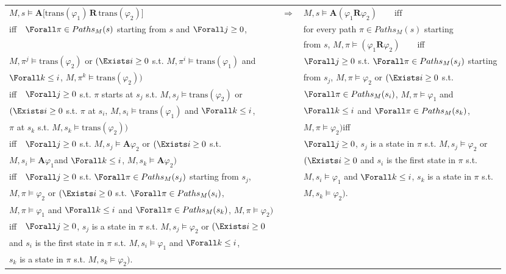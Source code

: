 {\begin{enumerate}
{\scriptsize
\begin{tabular}{lcl}
$M,s\vDash \mathbf{A[}\mathrm{trans}(\varphi _{1})\,\mathbf{R\,}\mathrm{trans%
}(\varphi _{2})]$ & $ \Rightarrow  $ & $M,s\vDash \mathbf{A}%
(\varphi _{1}\mathbf{R}\varphi _{2})\qquad \text{iff}$ \\ 
iff$\quad \Forall\pi \in Paths_{M}(s)$ starting from $s$ and $\Forall j\geq 0
$, &  & for every path $\pi \in Paths_{M}(s)$ starting \\ 
&  &  from $s$, $M,\pi \vDash (\varphi _{1}\mathbf{R}\varphi _{2})\qquad $iff
\\ 
$M,\pi ^{j}\vDash \mathrm{trans}(\varphi _{2})$ or $(\Exists i\geq 0$ s.t. $%
M,\pi ^{i}\vDash \mathrm{trans}(\varphi _{1})$ and &  & $\Forall j\geq 0$
s.t. $\Forall\pi \in Paths_{M}(s_{j})$ starting \\ 
$\Forall k\leq i$, $M,\pi ^{k}\vDash \mathrm{trans}(\varphi _{2}))$ &  & 
from $s_{j}$, $M,\pi \vDash \varphi _{2}$ or $(\Exists i\geq 0$ s.t. \\ 
iff$\quad \Forall j\geq 0$ s.t. $\pi $ starts at $s_{j}$ s.t. $M,s_{j}\vDash 
\mathrm{trans}(\varphi _{2})$ or &  & $\Forall\pi \in Paths_{M}(s_{i})$, $%
M,\pi \vDash \varphi _{1}$ and \\ 
$(\Exists i\geq 0$ s.t. $\pi $ at $s_{i}$, $M,s_{i}\vDash \mathrm{trans}%
(\varphi _{1})$ and $\Forall k\leq i$, &  & $\Forall k\leq i$ and $\Forall%
\pi \in Paths_{M}(s_{k})$, \\ 
$\pi $ at $s_{k}$ s.t. $M,s_{k}\vDash \mathrm{trans}(\varphi _{2}))$ &  &  $%
M,\pi \vDash \varphi _{2})$\qquad iff \\ 
iff$\quad \Forall j\geq 0$ s.t. $M,s_{j}\vDash \mathbf{A}\varphi _{2}$ or $(%
\Exists i\geq 0$ s.t. &  & $\Forall j\geq 0$, $s_{j}$ is a state in $\pi $
s.t. $M,s_{j}\vDash \varphi _{2}$ or \\ 
$M,s_{i}\vDash \mathbf{A}\varphi _{1}$and $\Forall k\leq i$, $M,s_{k}\vDash 
\mathbf{A}\varphi _{2})$ &  & $(\Exists i\geq 0$ and $s_{i}$ is the first
state in $\pi $ s.t. \\ 
iff$\quad \Forall j\geq 0$ s.t. $\Forall\pi \in Paths_{M}(s_{j})$ starting
from $s_{j}$, &  & $M,s_{i}\vDash \varphi _{1}$ and $\Forall k\leq i$, $s_{k}
$ is a state in $\pi $ s.t. \\ 
$M,\pi \vDash \varphi _{2}$ or $(\Exists i\geq 0$ s.t. $\Forall\pi \in
Paths_{M}(s_{i})$, &  & $M,s_{k}\vDash \varphi _{2})$. \\ 
$M,\pi \vDash \varphi _{1}$ and $\Forall k\leq i$ and $\Forall\pi \in
Paths_{M}(s_{k})$, $M,\pi \vDash \varphi _{2})$ &  &  \\ 
iff$\quad \Forall j\geq 0$, $s_{j}$ is a state in $\pi $ s.t. $M,s_{j}\vDash
\varphi _{2}$ or $(\Exists i\geq 0$ &  &  \\ 
and $s_{i}$ is the first state in $\pi $ s.t. $M,s_{i}\vDash \varphi _{1}$
and $\Forall k\leq i$, &  &  \\ 
$s_{k}$ is a state in $\pi $ s.t. $M,s_{k}\vDash \varphi _{2})$. &  & 
\end{tabular}
}
\end{enumerate}
}

